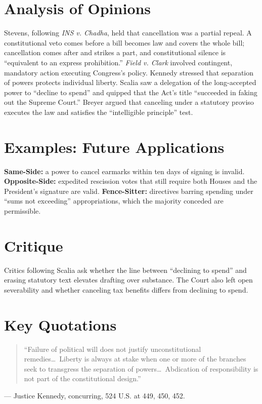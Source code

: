 \documentclass[12pt]{article}
\begin{document}
\section{Analysis of Opinions}
Stevens, following \textit{INS v. Chadha}, held that cancellation was a partial repeal. A constitutional veto comes before a bill becomes law and covers the whole bill; cancellation comes after and strikes a part, and constitutional silence is ``equivalent to an express prohibition.'' \textit{Field v. Clark} involved contingent, mandatory action executing Congress's policy. Kennedy stressed that separation of powers protects individual liberty. Scalia saw a delegation of the long-accepted power to ``decline to spend'' and quipped that the Act's title ``succeeded in faking out the Supreme Court.'' Breyer argued that canceling under a statutory proviso executes the law and satisfies the ``intelligible principle'' test.

\section{Examples: Future Applications}
\textbf{Same-Side:} a power to cancel earmarks within ten days of signing is invalid. \textbf{Opposite-Side:} expedited rescission votes that still require both Houses and the President's signature are valid. \textbf{Fence-Sitter:} directives barring spending under ``sums not exceeding'' appropriations, which the majority conceded are permissible.

\section{Critique}
Critics following Scalia ask whether the line between ``declining to spend'' and erasing statutory text elevates drafting over substance. The Court also left open severability and whether canceling tax benefits differs from declining to spend.

\section{Key Quotations}
\begin{quote}
``Failure of political will does not justify unconstitutional remedies\ldots\ Liberty is always at stake when one or more of the branches seek to transgress the separation of powers\ldots\ Abdication of responsibility is not part of the constitutional design.''
\end{quote}
\noindent --- Justice Kennedy, concurring, 524 U.S. at 449, 450, 452.
\end{document}
